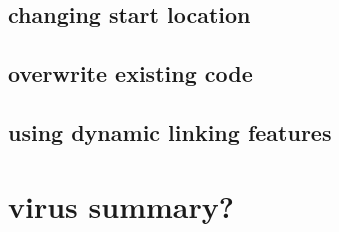 

\subsection{changing start location}



\subsection{overwrite existing code}



\subsection{using dynamic linking features}



\section{virus summary?}


